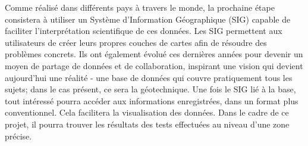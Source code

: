 \par
Comme réalisé dans différents pays à travers le monde, la prochaine 
étape consistera à utiliser un Système d'Information Géographique (SIG) 
capable de faciliter l'interprétation scientifique de ces données. 
Les SIG permettent aux utilisateurs de créer leurs propres couches de cartes 
afin de résoudre des problèmes concrets. Ils ont également évolué ces dernières années pour 
devenir un moyen de partage de données et de collaboration, inspirant une 
vision qui devient aujourd’hui une réalité - une base de données qui 
couvre pratiquement tous les sujets; dans le cas présent, ce sera la géotechnique. 
Une fois le SIG lié à la base, tout intéressé pourra accéder aux informations 
enregistrées, dans un format plus conventionnel. Cela facilitera la visualisation des données. 
Dans le cadre de ce projet, il 
pourra trouver les résultats des tests effectuées au niveau d'une zone précise.